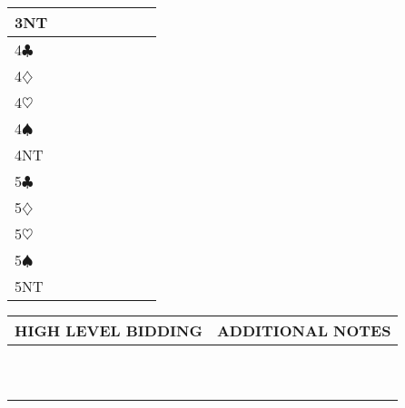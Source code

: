 \documentclass{article}
\newcommand\C{\ensuremath{\clubsuit}}
\newcommand\D{\ensuremath{\diamondsuit}}
\renewcommand\H{\ensuremath{\heartsuit}}
\renewcommand\S{\ensuremath{\spadesuit}}
\newcommand\N{{\footnotesize NT}}
\begin{document}
\begin{tabular}{| p{9mm} | p{9mm} | p{9mm} | p{9mm} | p{54mm} | p{54mm} | p{54mm} | p{54mm} |}
	3\N & & & & & & & \\ \hline
	4\C & & & & & & & \\ \hline
	4\D & & & & & & & \\ \hline
	4\H & & & & & & & \\ \hline
	4\S & & & & & & & \\ \hline
	4\N & & & & & & & \\ \hline
	5\C & & & & & & & \\ \hline
	5\D & & & & & & & \\ \hline
	5\H & & & & & & & \\ \hline
	5\S & & & & & & & \\ \hline
	5\N & & & & & & & \\ \hline
\end{tabular}

\noindent
\begin{tabular}{| p{139.1mm} | p{139.1mm} |}
	\cellcolor[gray]{0.9} \textbf{HIGH LEVEL BIDDING} & \cellcolor[gray]{0.9} \textbf{ADDITIONAL NOTES} \\ \hline
	& \\ \hline
	& \\ \hline
	& \\ \hline
	& \\ \hline
	& \\ \hline
	& \\ \hline
	& \\ \hline
	& \\ \hline
	& \\ \hline
	& \\ \hline
\end{tabular}
\end{document}
